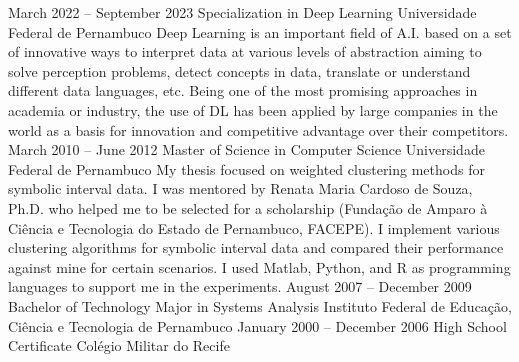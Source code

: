 \cvmetaevent
{March 2022 – September 2023}
{Specialization in Deep Learning}
{Universidade Federal de Pernambuco}
{Deep Learning is an important field of A.I. based on a set of innovative ways to interpret data at various levels of abstraction aiming to solve perception problems, detect concepts in data, translate or understand different data languages, etc. Being one of the most promising approaches in academia or industry, the use of DL has been applied by large companies in the world as a basis for innovation and competitive advantage over their competitors.}
\cvmetaevent
{March 2010 – June 2012}
{Master of Science in Computer Science}
{Universidade Federal de Pernambuco}
{My thesis focused on weighted clustering methods for symbolic interval data. I was mentored by Renata Maria Cardoso de Souza, Ph.D. who helped me to be selected for a scholarship (Fundação de Amparo à Ciência e Tecnologia do Estado de Pernambuco, FACEPE). I implement various clustering algorithms for symbolic interval data and compared their performance against mine for certain scenarios. I used Matlab, Python, and R as programming languages to support me in the experiments.}
\cvmetaevent
{August 2007 – December 2009}
{Bachelor of Technology Major in Systems Analysis}
{Instituto Federal de Educação, Ciência e Tecnologia de Pernambuco}
{}
\cvmetaevent
{January 2000 – December 2006}
{High School Certificate}
{Colégio Militar do Recife}
{}
